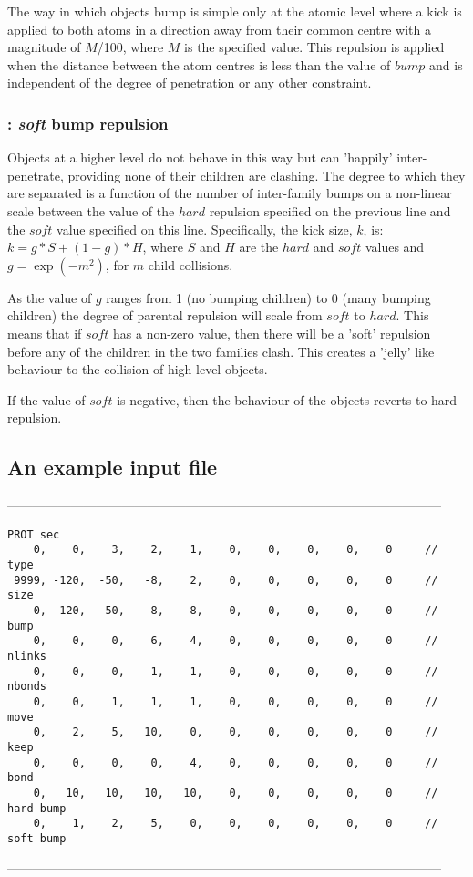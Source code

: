 The way in which objects bump is simple only at the atomic level where a kick is applied
to both atoms in a direction away from their common centre with a magnitude of $M$/100,
where $M$ is the specified value.  This repulsion is applied when the distance between
the atom centres is less than the value of $bump$ and is independent of the degree of
penetration or any other constraint.

\subsubsection{: {\em soft} bump repulsion}

Objects at a higher level do not behave in this way but can 'happily' inter-penetrate,
providing none of their children are clashing.   The degree to which they are separated
is a function of the number of inter-family bumps on a non-linear scale between the value
of the $hard$ repulsion specified on the previous line and the $soft$ value specified
on this line.  Specifically, the kick size, $k$, is: $k = g*S + (1-g)*H$, where $S$ 
and $H$ are the $hard$ and $soft$ values and $g = \exp (-m^2)$, for $m$ child collisions.

As the value of $g$ ranges from 1 (no bumping children) to 0 (many bumping children) the
degree of parental repulsion will scale from $soft$ to $hard$.   This means that if $soft$
has a non-zero value, then there will be a 'soft' repulsion before any of the children in the
two families clash.  This creates a 'jelly' like behaviour to the collision of high-level
objects.

If the value of $soft$ is negative, then the behaviour of the objects reverts to hard repulsion.

\subsection{An example input file}

\begin{singlespace}
------------------------------------------------------------------------------------------------------
\begin{footnotesize}
\begin{verbatim}
PROT sec
    0,    0,    3,    2,    1,    0,    0,    0,    0,    0    	// type
 9999, -120,  -50,   -8,    2,    0,    0,    0,    0,    0    	// size
    0,  120,   50,    8,    8,    0,    0,    0,    0,    0    	// bump
    0,    0,    0,    6,    4,    0,    0,    0,    0,    0    	// nlinks
    0,    0,    0,    1,    1,    0,    0,    0,    0,    0    	// nbonds
    0,    0,    1,    1,    1,    0,    0,    0,    0,    0    	// move
    0,    2,    5,   10,    0,    0,    0,    0,    0,    0    	// keep
    0,    0,    0,    0,    4,    0,    0,    0,    0,    0    	// bond
    0,   10,   10,   10,   10,    0,    0,    0,    0,    0    	// hard bump
    0,    1,    2,    5,    0,    0,    0,    0,    0,    0    	// soft bump
\end{verbatim}
\end{footnotesize}
------------------------------------------------------------------------------------------------------
\end{singlespace}


